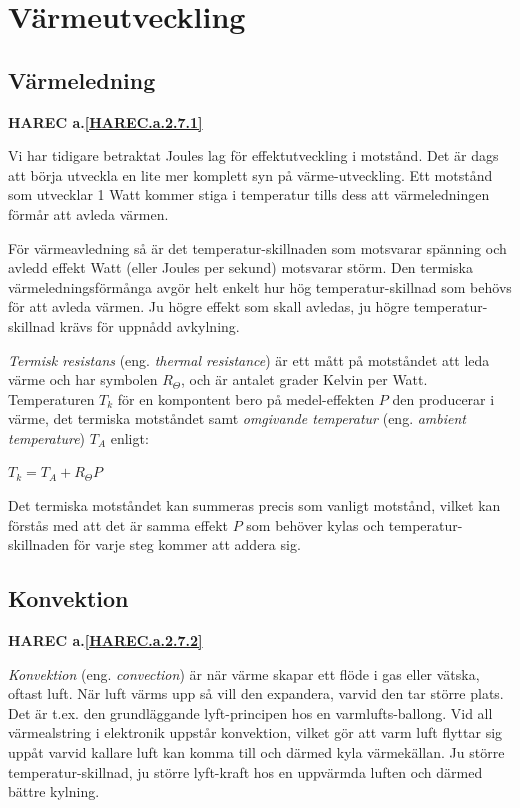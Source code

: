 \section{Värmeutveckling}

\subsection{Värmeledning}
\textbf{
HAREC a.\ref{HAREC.a.2.7.1}\label{myHAREC.a.2.7.1}
}

Vi har tidigare betraktat Joules lag för effektutveckling i motstånd.
Det är dags att börja utveckla en lite mer komplett syn på värme-utveckling.
Ett motstånd som utvecklar 1 Watt kommer stiga i temperatur tills dess att
värmeledningen förmår att avleda värmen.

För värmeavledning så är det temperatur-skillnaden som motsvarar spänning och
avledd effekt Watt (eller Joules per sekund) motsvarar störm. Den termiska
värmeledningsförmånga avgör helt enkelt hur hög temperatur-skillnad som behövs
för att avleda värmen. Ju högre effekt som skall avledas, ju högre temperatur-
skillnad krävs för uppnådd avkylning.

\emph{Termisk resistans} (eng. \emph{thermal resistance}) är ett mått på
motståndet att leda värme och har symbolen \(R_\Theta\), och är antalet grader
Kelvin per Watt. Temperaturen \(T_k\) för en kompontent bero på medel-effekten
\(P\) den producerar i värme, det termiska motståndet samt
\emph{omgivande temperatur} (eng. \emph{ambient temperature}) \(T_A\) enligt:

\(T_k = T_A + R_\Theta P\)

Det termiska motståndet kan summeras precis som vanligt motstånd, vilket kan
förstås med att det är samma effekt \(P\) som behöver kylas och temperatur-
skillnaden för varje steg kommer att addera sig.

\subsection{Konvektion}
\textbf{
HAREC a.\ref{HAREC.a.2.7.2}\label{myHAREC.a.2.7.2}
}

\emph{Konvektion} (eng. \emph{convection}) är när värme skapar ett flöde i
gas eller vätska, oftast luft. När luft värms upp så vill den expandera, varvid
den tar större plats. Det är t.ex. den grundläggande lyft-principen hos en
varmlufts-ballong. Vid all värmealstring i elektronik uppstår konvektion, vilket
gör att varm luft flyttar sig uppåt varvid kallare luft kan komma till och
därmed kyla värmekällan. Ju större temperatur-skillnad, ju större lyft-kraft
hos en uppvärmda luften och därmed bättre kylning.

